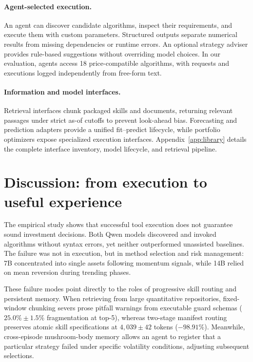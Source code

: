 \documentclass[11pt]{article}
\begin{document}
\paragraph{Agent-selected execution.}
An agent can discover candidate algorithms, inspect their requirements, and execute them
with custom parameters. Structured outputs separate numerical results from missing
dependencies or runtime errors. An optional strategy adviser provides rule-based
suggestions without overriding model choices. In our evaluation, agents access 18
price-compatible algorithms, with requests and executions logged independently from
free-form text.

\paragraph{Information and model interfaces.}
Retrieval interfaces chunk packaged skills and documents, returning relevant passages
under strict as-of cutoffs to prevent look-ahead bias. Forecasting and prediction
adapters provide a unified fit--predict lifecycle, while portfolio optimizers expose
specialized execution interfaces. Appendix~\ref{app:library} details the complete
interface inventory, model lifecycle, and retrieval pipeline.






\section{Discussion: from execution to useful experience}
The empirical study shows that successful tool execution does not guarantee sound
investment decisions. Both Qwen models discovered and invoked algorithms without syntax
errors, yet neither outperformed unassisted baselines. The failure was not in execution,
but in method selection and risk management: 7B concentrated into single assets following
momentum signals, while 14B relied on mean reversion during trending phases.

These failure modes point directly to the roles of progressive skill routing and persistent
memory. When retrieving from large quantitative repositories, fixed-window chunking severs
prose pitfall warnings from executable guard schemas ($25.0\% \pm 1.5\%$ fragmentation at top-5),
whereas two-stage manifest routing preserves atomic skill specifications at $4{,}039 \pm 42$ tokens
($-98.91\%$). Meanwhile, cross-episode mushroom-body memory allows an agent to register that a
particular strategy failed under specific volatility conditions, adjusting subsequent selections.
\end{document}

